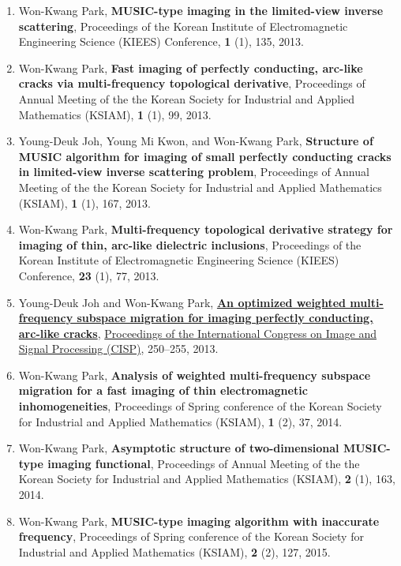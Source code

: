 \documentclass[10pt,A4]{article}
\begin{document}
\begin{enumerate}
\item\label{C-KIEES2013A} Won-Kwang Park, \textbf{MUSIC-type imaging in the limited-view inverse scattering}, Proceedings of the Korean Institute of Electromagnetic Engineering Science (KIEES) Conference, \textbf{1} (1), 135, 2013.
\item\label{C-KSIAM2013D} Won-Kwang Park, \textbf{Fast imaging of perfectly conducting, arc-like cracks via multi-frequency topological derivative}, Proceedings of Annual Meeting of the the Korean Society for Industrial and Applied Mathematics (KSIAM), \textbf{1} (1), 99, 2013.
\item\label{C-KSIAM2013E} Young-Deuk Joh, Young Mi Kwon, and Won-Kwang Park, \textbf{Structure of MUSIC algorithm for imaging of small perfectly conducting cracks in limited-view inverse scattering problem}, Proceedings of Annual Meeting of the the Korean Society for Industrial and Applied Mathematics (KSIAM), \textbf{1} (1), 167, 2013.
\item\label{C-KIEES2013B} Won-Kwang Park, \textbf{Multi-frequency topological derivative strategy for imaging of thin, arc-like dielectric inclusions}, Proceedings of the Korean Institute of Electromagnetic Engineering Science (KIEES) Conference, \textbf{23} (1), 77, 2013.
\item\label{C-CISP2013B} Young-Deuk Joh and Won-Kwang Park, \href{http://dx.doi.org/10.1109/CISP.2013.6743996}{\textbf{An optimized weighted multi-frequency subspace migration for imaging perfectly conducting, arc-like cracks}}, \href{http://ieeexplore.ieee.org/xpl/mostRecentIssue.jsp?punumber=6731781}{Proceedings of the  International Congress on Image and Signal Processing (CISP)}, 250--255, 2013.
\item\label{C-KSIAM2014A} Won-Kwang Park, \textbf{Analysis of weighted multi-frequency subspace migration for a fast imaging of thin electromagnetic inhomogeneities}, Proceedings of Spring conference of the Korean Society for Industrial and Applied Mathematics (KSIAM), \textbf{1} (2), 37, 2014.
\item\label{C-KSIAM2014B} Won-Kwang Park, \textbf{Asymptotic structure of two-dimensional MUSIC-type imaging functional}, Proceedings of Annual Meeting of the the Korean Society for Industrial and Applied Mathematics (KSIAM), \textbf{2} (1), 163, 2014.
\item\label{C-KSIAM2015A} Won-Kwang Park, \textbf{MUSIC-type imaging algorithm with inaccurate frequency}, Proceedings of Spring conference of the Korean Society for Industrial and Applied Mathematics (KSIAM), \textbf{2} (2), 127, 2015.

\end{enumerate}
\end{document}
